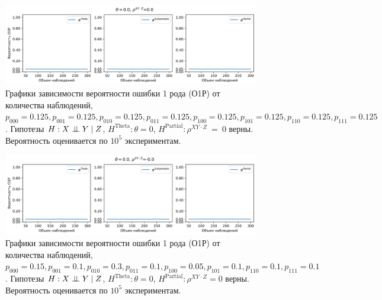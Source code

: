 \begin{figure}[H]
    \centering
    \includegraphics[scale=0.65]{images/graph1.png}
    \caption{Графики зависимости вероятности ошибки 1 рода (О1Р) от количества наблюдений,
     $p_{000}=0.125, p_{001}=0.125, p_{010}=0.125, p_{011}=0.125,
    p_{100}=0.125, p_{101}=0.125, p_{110}=0.125, p_{111}=0.125$. 
    Гипотезы $H: X \perp\!\!\!\perp Y \mid Z$,
    $H^{\text{Theta}}: \theta=0$, 
    $H^{\text{Partial}}: \rho^{XY\cdot Z}~=~0$
    верны.
    Вероятность оценивается по $10^5$ экспериментам.} \label{fig:1}
\end{figure}
    

\begin{figure}[H]
    \centering
    \includegraphics[scale=0.65]{images/graph2.png}
    \caption{Графики зависимости вероятности ошибки 1 рода (О1Р) от количества наблюдений,
    $p_{000}=0.15, p_{001}=0.1, p_{010}=0.3, p_{011}=0.1,
    p_{100}=0.05, p_{101}=0.1, p_{110}=0.1, p_{111}=0.1$. 
    Гипотезы $H: X \perp\!\!\!\perp Y \mid Z$,
    $H^{\text{Theta}}: \theta=0$, 
    $H^{\text{Partial}}: \rho^{XY\cdot Z}=0$ верны.
    Вероятность оценивается по $10^5$ экспериментам.} \label{fig:2}
\end{figure}

